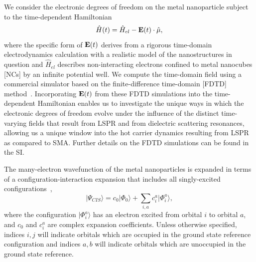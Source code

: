 \documentclass[journal=jpclcd,manuscript=article]{achemso}
\begin{document}
We consider the electronic degrees of freedom on the metal nanoparticle subject to the time-dependent Hamiltonian 
\begin{equation}\label{eq:TDHam}
\hat{H}(t) = \hat{H}_{el} - {\bf E}(t) \cdot \hat{\mu}, 
\end{equation}
where the specific form of ${\bf E}(t)$ derives from a rigorous time-domain electrodynamics calculation with a realistic model
of the nanostructures in question and $\hat{H}_{el}$ describes non-interacting electrons confined to metal nanocubes [NCs] by an infinite potential well.  
We compute the time-domain field 
using a commercial simulator based on the finite-difference time-domain [FDTD] method~\cite{Lumerical}.  
Incorporating  ${\bf E}(t)$ from these FDTD simulations into the time-dependent Hamiltonian enables us to investigate the unique ways
in which the electronic degrees of freedom evolve under the influence of the distinct time-varying fields that result
from LSPR and from dielectric scattering resonances, allowing us a unique window into the hot carrier dynamics resulting from LSPR as compared
to SMA.  Further details on the FDTD simulations can be found in the SI. 

The many-electron wavefunction of the metal nanoparticles is expanded in terms of a configuration-interaction expansion that
includes all singly-excited configurations~\cite{Szabo},
\begin{equation}\label{eq:CIS}
|\Psi_{CIS}\rangle = c_0 |\Phi_0 \rangle + \sum_{i,a} c_i^a |\Phi_i^a\rangle,
\end{equation}
where the configuration $|\Phi_i^a\rangle$ has an electron excited from orbital $i$ to orbital $a$, 
and $c_0$ and $c_i^a$ are complex expansion coefficients.  Unless otherwise specified, indices $i, j$ will indicate
orbitals which are occupied in the ground state reference configuration and indices $a, b$ will indicate orbitals
which are unoccupied in the ground state reference.  
\end{document}
